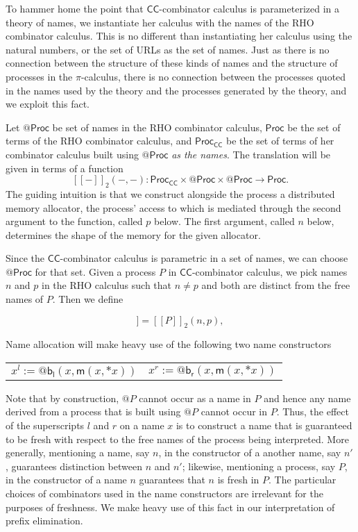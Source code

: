 \documentclass[submission,copyright,creativecommons]{eptcs}
\makeatletter
\newcommand{\pic}{$\pi$-calculus}
\newcommand{\ccomb}{$\mathsf{CC}$-combinator calculus}
\newcommand{\ldb}{[\![}
\newcommand{\rdb}{]\!]}
\newcommand{\quotep}[1]{\mathsf{@}#1}
\newcommand{\meaningof}[1]{\ldb #1 \rdb}
\newcommand{\Proc}{\mathsf{Proc}}
\newcommand{\QProc}{\quotep{\mathsf{Proc}}}
\newcommand{\red}{\rightarrow}
\theoremstyle{definition}
\theoremstyle{remark}
\theoremstyle{remark}
\makeatother
\begin{document}
To hammer home the point that {\ccomb} is
parameterized in a theory of names, we instantiate her calculus with
the names of the RHO combinator calculus. This is no different than
instantiating her calculus using the natural numbers, or the set of URLs as the
set of names. Just as there is no connection between the structure of
these kinds of names and the structure of processes in the {\pic},
there is no connection between the processes quoted in the names used
by the theory and the processes generated by the theory, and we
exploit this fact.

Let $\QProc$ be set of names in the RHO combinator calculus, $\Proc$
be the set of terms of the RHO combinator calculus, and
$\Proc_{\mathsf{CC}}$ be the set of terms of her combinator
calculus built using $\QProc$ \emph{as the names}. The translation will be
given in terms of a function \[\meaningof{-}_2( -, - ) : 
    \Proc_{\mathsf{CC}} \times \QProc {\times} \QProc \red \Proc.\] 
The guiding intuition is that we construct alongside the process a distributed memory
allocator, the process' access to which is mediated through the second argument
to the function, called $p$ below. The first argument, called $n$ below, determines the shape of the memory for the given allocator.

Since the {\ccomb} is parametric in a set of names, we can
choose $\QProc$ for that set.  Given a process $P$ in {\ccomb}, we pick names $n$ and $p$ in the RHO calculus such that $n \neq p$
and both are distinct from the free names of $P$.  Then we define

\begin{equation*}
  \meaningof{P} = \meaningof{P}_2(n, p),
\end{equation*}

Name allocation will make heavy use of the following two name
constructors

\begin{tabular}{cc}
  $x^l := \quotep{\mathsf{b}_{\mathsf{l}}(x,\mathsf{m}(x,*x))}$ & $x^r := \quotep{\mathsf{b}_{\mathsf{r}}(x,\mathsf{m}(x,*x))}$
\end{tabular}

Note that by construction, $\quotep{P}$ cannot occur as a name in $P$
and hence any name derived from a process that is built using
$\quotep{P}$ cannot occur in $P$. Thus, the effect of the superscripts
$l$ and $r$ on a name $x$ is to construct a name that is guaranteed to
be fresh with respect to the free names of the process being
interpreted. More generally, mentioning a name, say $n$, in the
constructor of a another name, say $n'$, guarantees distinction
between $n$ and $n'$; likewise, mentioning a process, say $P$, in the
constructor of a name $n$ guarantees that $n$ is fresh in $P$. The
particular choices of combinators used in the name
constructors are irrelevant for the purposes of freshness. We
make heavy use of this fact in our interpretation of prefix
elimination.
\end{document}
